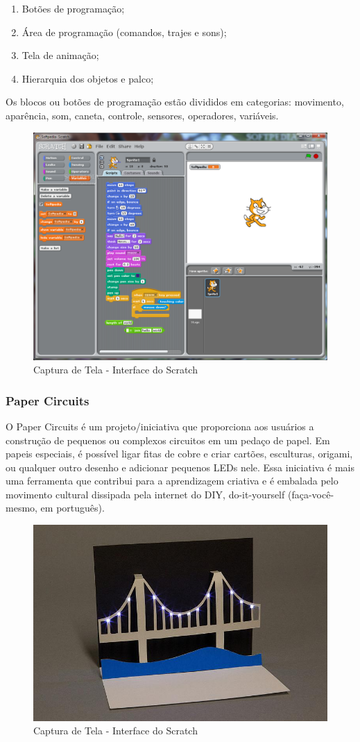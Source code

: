\begin{enumerate}
  \item Botões de programação;
  \item Área de programação (comandos, trajes e sons);
  \item Tela de animação;
  \item Hierarquia dos objetos e palco;
\end{enumerate}

Os blocos ou botões de programação estão divididos em categorias: movimento, aparência, som, caneta, controle, sensores, operadores, variáveis.

\begin{figure}[H]
\centering
\includegraphics[width=.5\textwidth]{edit/img/scratch.png}
\caption{Captura de Tela - Interface do Scratch}
\label{scratch}
\end{figure}

\subsubsection{Paper Circuits}

O Paper Circuits é um projeto/iniciativa que proporciona aos usuários a construção de pequenos ou complexos circuitos em um pedaço de papel. Em papeis especiais, é possível ligar fitas de cobre e criar cartões, esculturas, origami, ou qualquer outro desenho e adicionar pequenos LEDs nele.
Essa iniciativa é mais uma ferramenta que contribui para a aprendizagem criativa e é embalada pelo movimento cultural dissipada pela internet do DIY, do-it-yourself (faça-você-mesmo, em português).

\begin{figure}[H]
\centering
\includegraphics[width=.5\textwidth]{edit/img/circuitpaper.jpg}
\caption{Captura de Tela - Interface do Scratch}
\label{fig:exampleFig1}
\end{figure}

